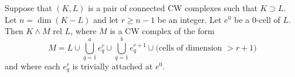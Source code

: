 Suppose that $(K, L)$ is a pair of connected CW complexes such that $K \supset L$. Let $n = \dim(K-L)$ and let $r \geq n-1$ be an integer. Let $e^0$ be a 0-cell of $L$. Then $K \wedge M$ rel $L$, where $M$ is a CW complex of the form
$$M = L \cup \bigcup_{q=1}^{a} e_q^r \cup \bigcup_{q=1}^{b} e_q^{r+1} \cup \text{(cells of dimension } > r+1\text{)}$$
and where each $e_q^r$ is trivially attached at $e^0$.
